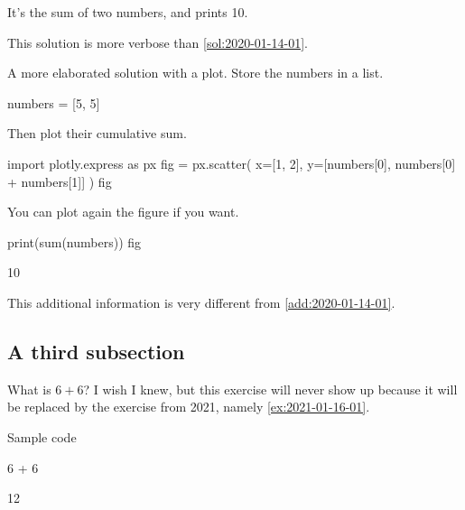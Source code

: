 \documentclass{book}
\begin{document}
\begin{solution}
It's the sum of two numbers, and prints 10.

This solution is more verbose than \cref{sol:2020-01-14-01}.
\end{solution}

\begin{additionalinformation}
A more elaborated solution with a plot. Store the numbers in a list.

\begin{pycell}
numbers = [5, 5]
\end{pycell}

Then plot their cumulative sum.

\begin{pycell}
import plotly.express as px
fig = px.scatter(
    x=[1, 2],
    y=[numbers[0], numbers[0] + numbers[1]]
)
fig
\end{pycell}

You can plot again the figure if you want.

\begin{pycell}
print(sum(numbers))
fig
\end{pycell}
\begin{pyexpectedoutput}
10
\end{pyexpectedoutput}

This additional information is very different from \cref{add:2020-01-14-01}.
\end{additionalinformation}

\subsection{A third subsection}

\begin{exercise}[examdate={January 16, 2020}, examproblemnumber={1}, examproblemid={2020-01-16-01}, replacedbyexamproblemid={2021-01-16-01}, replacementsinceacademicyear={2025/2026}]
  What is \(6 + 6\)? I wish I knew, but this exercise will never show up because it will be replaced by the exercise from 2021, namely \cref{ex:2021-01-16-01}.

Sample code
\begin{pycell}
6 + 6
\end{pycell}
\begin{pyexpectedoutput}
12
\end{pyexpectedoutput}
\end{exercise}
\end{document}
